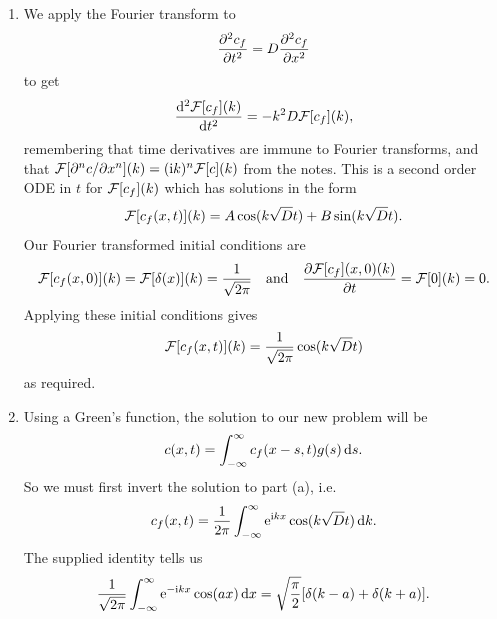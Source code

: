 \documentclass[a4paper, 12pt]{article}
\begin{document}
\begin{enumerate}[label={\bf \arabic{*}.\;}, ref={\arabic{*}},itemsep=3ex, left=0ex]
{\begin{enumerate}[label=(\alph*)]
      \end{enumerate}
    }
    {
      \begin{enumerate}[label=(\alph*)]
        \item{ We apply the Fourier transform to
            \begin{equation}
              \pdd{c_f}{t} = D\pdd{c_f}{x}
            \end{equation}
            to get
            \begin{equation}
              \fdd{\Four[c_f](k)}{t} = -k^2 D \Four[c_f](k),
            \end{equation}
            remembering that time derivatives are immune to Fourier transforms, and that $\Four[\pdn{n}{c}{x}](k) = (\i k)^n \Four[c](k)$ from the notes. This is a second order ODE in $t$ for $\mathcal{F}[c_f](k)$ which has solutions in the form
            \begin{equation}
              \mathcal{F}[c_f(x,t)](k) = A\cos(k \sqrt{D} t) + B\sin(k \sqrt{D} t).
            \end{equation}
            Our Fourier transformed initial conditions are
            \begin{equation}
              \Four[c_f(x,0)](k) = \Four[\delta(x)](k) = \frac{1}{\sqrt{2\pi}}\quad\text{and}\quad \pd{\Four[c_f](x,0)(k)}{t} = \Four[0](k) = 0.
            \end{equation}
            Applying these initial conditions gives
            \begin{equation}
              \mathcal{F}[c_f(x,t)](k) = \frac{1}{\sqrt{2\pi}}\cos(k \sqrt{D} t)
            \end{equation}
            as required.
          }
        \item{
            Using a Green's function, the solution to our new problem will be
            \begin{equation}
              c(x,t)=\int_{-\infty}^{\infty}c_f(x-s,t)g(s)\,{\mathrm d}{s}.
            \end{equation}
            So we must first invert the solution to part (a), i.e.\
            \begin{equation}
              c_f(x,t) = \frac{1}{2\pi}\int_{-\infty}^{\infty}\mathrm{e} ^{\mathrm{i} kx}\cos(k\sqrt{D}t)\,{\mathrm d}{k}.
            \end{equation}
            The supplied identity tells us
            \begin{equation}
              \frac{1}{\sqrt{2\pi}}\int_{-\infty}^\infty \e^{-\i k x} \cos(ax)\, \d x = \sqrt{\frac{\pi}{2}}[\delta(k-a) + \delta(k+a)].

\end{equation}}
\end{enumerate}}
\end{enumerate}
\end{document}
